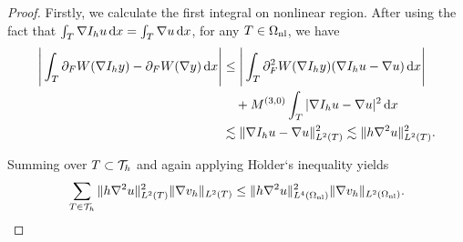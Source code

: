 \begin{proof}
	
	Firstly, we calculate the first integral on nonlinear region. After using the fact that $\int_{T}\nabla I_{h} u\,\text{d} x=\int_{T} \nabla u\,\text{d} x$, for any $T\in \Omega_{{\rm nl}}$, we have
	\begin{equation*}
		\begin{aligned}
			\Bigg \vert \int_{T} \partial_{F} W(\nabla I_{h} y) - \partial_{F} W(\nabla y) \,\text{d} x \Bigg \vert &\le \Bigg \vert \int_{T}\partial^{2}_{F}W(\nabla I_{h} y)(\nabla I_{h} u -\nabla u)\,\text{d} x \Bigg \vert\\
			&\quad + M^{(3,0)}\int_{T}\vert \nabla I_{h} u-\nabla u\vert^{2}\,\text{d} x\\
			&\lesssim \Vert \nabla I_{h} u -\nabla u\Vert^{2}_{L^{2}(T)}\lesssim \Vert h\nabla^{2} u\Vert^{2}_{L^{2}(T)}.
		\end{aligned}
	\end{equation*}
	
	Summing over $T\subset \mathcal{T}_{h}$ and again applying H$\ddot{\text{o}}$lder‘s inequality yields
	\begin{equation*}
		\sum_{T \in \mathcal{T}_{h}} \Vert h\nabla^{2} u\Vert^{2}_{L^{2}(T)}\Vert \nabla v_{h} \Vert_{L^{2}(T)}
		\le \Vert h\nabla^{2} u\Vert^{2}_{L^{4}(\Omega_{{\rm nl}})}\Vert \nabla v_{h} \Vert_{L^{2}(\Omega_{{\rm nl}})}.
	\end{equation*}
	
	
	

\end{proof}
